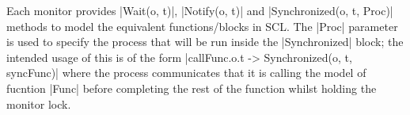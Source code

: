 Each monitor provides |Wait(o, t)|, |Notify(o, t)| and |Synchronized(o, t, Proc)| methods to model the equivalent functions/blocks in SCL. The |Proc| parameter is used to specify the process that will be run inside the |Synchronized| block; the intended usage of this is of the form |callFunc.o.t -> Synchronized(o, t, syncFunc)| where the process communicates that it is calling the model of fucntion |Func| before completing the rest of the function whilst holding the monitor lock.


% 


